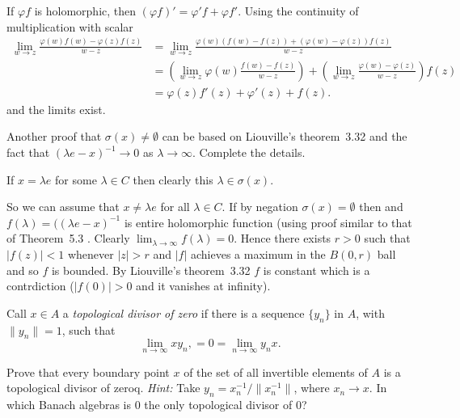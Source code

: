 \begin{enumerate}
If \(\varphi f \) is holomorphic, then
\((\varphi f)' = \varphi'f + \varphi f'\).
Using the continuity of multiplication with scalar
\begin{align*}
 \lim_{w\to z} \frac{\varphi(w)f(w) - \varphi(z)f(z)}{w - z}
 &= \lim_{w\to z} \frac{
   \varphi(w)(f(w) - f(z)) + (\varphi(w) - \varphi(z))f(z)}{w - z} \\
 &= \left(\lim_{w\to z} \varphi(w)\frac{f(w) - f(z)}{w - z}\right) +
    \left(\lim_{w\to z} \frac{\varphi(w) - \varphi(z)}{w - z}\right)f(z) \\
 &= \varphi(z)f'(z) + \varphi'(z)+f(z).
\end{align*}
and the limits exist.

\begin{excopy}
Another proof that \(\sigma(x) \neq \emptyset\)
  can be based on Liouville’s theorem~3.32 and the
fact that \((\lambda e - x)^{-1} \to 0\) as \(\lambda \to \infty\).
  Complete the details.
\end{excopy}

If \(x = \lambda e\) for some \(\lambda \in C\) then
clearly this \(\lambda \in \sigma(x)\).

So we can assume that \(x \neq \lambda e\) for all  \(\lambda \in C\).
If by negation  \(\sigma(x) = \emptyset\) then
and \(f(\lambda) = ((\lambda e - x)^{-1}\) is entire holomorphic
function (using proof similar to that of Theorem~5.3 \cite{RudinPMA85}.
Clearly \(\lim_{\lambda\to\infty}f(\lambda) = 0\).
Hence there exists \(r>0\) such that \(|f(z)| < 1\) whenever \(|z|>r\)
and \(|f|\) achieves a maximum in the \(B(0,r)\) ball
and so $f$ is bounded. By Liouville’s theorem~3.32 $f$ is constant
which is a contrdiction (\(|f(0)| > 0\) and it vanishes at infinity).

\begin{excopy}
Call \(x \in A\) a \emph{topological divisor of zero}
if there is a sequence \(\{y_n\}\) in $A$, with
\(\|y_n\| = 1\), such that
\begin{equation*}
\lim_{n\to\infty} xy_n, = 0 = \lim_{n\to\infty} y_nx.
\end{equation*}
\begin{itemize}
Prove that every boundary point $x$
  of the set of all invertible elements of $A$ is
a topological divisor of zeroq.
  \emph{Hint:} Take \(y_n = x_n^{-1} /\|x_n^{-1}\|\), where \(x_n \to x\).
In which Banach algebras is $0$ the only topological divisor of $0$?
\end{itemize}
\end{excopy}


\end{enumerate}
